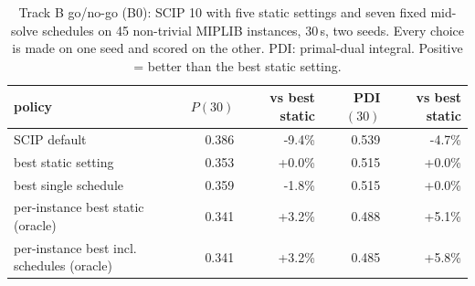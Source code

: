 \begin{table}[t]\centering\small
\begin{tabular}{lrrrr}
\toprule
policy & $P(30)$ & vs best static & PDI$(30)$ & vs best static \\
\midrule
SCIP default & 0.386 & -9.4\% & 0.539 & -4.7\% \\
best static setting & 0.353 & +0.0\% & 0.515 & +0.0\% \\
best single schedule & 0.359 & -1.8\% & 0.515 & +0.0\% \\
per-instance best static (oracle) & 0.341 & +3.2\% & 0.488 & +5.1\% \\
per-instance best incl. schedules (oracle) & 0.341 & +3.2\% & 0.485 & +5.8\% \\
\bottomrule
\end{tabular}
\caption{Track B go/no-go (B0): SCIP 10 with five static settings and seven fixed mid-solve schedules on 45 non-trivial MIPLIB instances, 30\,s, two seeds. Every choice is made on one seed and scored on the other. PDI: primal-dual integral. Positive = better than the best static setting.}\label{tab:b0}
\end{table}